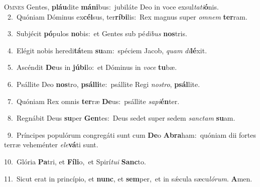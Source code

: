 \lettrine{\initial\textcolor{\initialcolor}{O}}{mnes} Gentes, \textbf{pláu}\-dite \textbf{má}\-\textbf{ni}bus:~\star jubiláte Deo in voce exsul\-\textit{ta}\-\textit{ti}\textbf{ó}nis.\\
{\numbfont\textcolor{\numbcolor}{~2.}}~Quóniam Dóminus ex\-\textbf{cél}\-sus, ter\-\textbf{rí}\-\textbf{bi}lis:~\star Rex magnus super \textit{om}\-\textit{nem} \textbf{ter}\-ram.\par
{\numbfont\textcolor{\numbcolor}{~3.}}~Subjécit \textbf{pó}\-pulos \textbf{no}\-bis:~\star et Gentes sub pé\-\textit{di}\-\textit{bus} \textbf{nos}\-tris.\par
{\numbfont\textcolor{\numbcolor}{~4.}}~Elégit nobis heredi\-\textbf{tá}\-tem \textbf{su}\-am:~\star spéciem Jacob, \textit{quam} \textit{di}\-\textbf{lé}xit.\par
{\numbfont\textcolor{\numbcolor}{~5.}}~Ascéndit \textbf{De}\-us in \textbf{jú}\-\textbf{bi}lo:~\star et Dóminus in \textit{vo}\-\textit{ce} \textbf{tu}\-bæ.\par
{\numbfont\textcolor{\numbcolor}{~6.}}~Psállite Deo \textbf{nos}\-tro, \textbf{psál}\-\textbf{li}te:~\star psállite Regi \textit{nos}\-\textit{tro}, \textbf{psál}\-lite.\par
{\numbfont\textcolor{\numbcolor}{~7.}}~Quóniam Rex omnis \textbf{ter}\-ræ \textbf{De}\-us:~\star psállite \textit{sa}\-\textit{pi}\textbf{én}ter.\par
{\numbfont\textcolor{\numbcolor}{~8.}}~Regnábit Deus \textbf{su}\-per \textbf{Gen}\-tes:~\star Deus sedet super sedem \textit{sanc}\-\textit{tam} \textbf{su}\-am.\par
{\numbfont\textcolor{\numbcolor}{~9.}}~Príncipes populórum congregáti sunt cum \textbf{De}\-o \textbf{A}\-\textbf{bra}ham:~\star quóniam dii fortes terræ veheménter \textit{e}\-\textit{le}\textbf{vá}ti sunt.\par
{\numbfont\textcolor{\numbcolor}{10.}}~Glória \textbf{Pa}\-tri, et \textbf{Fí}\-\textbf{li}o,~\star et Spirí\-\textit{tu}\-\textit{i} \textbf{Sanc}\-to.\par
{\numbfont\textcolor{\numbcolor}{11.}}~Sicut erat in princípio, et \textbf{nunc}\-, et \textbf{sem}\-per,~\star et in sǽcula sæcu\-\textit{ló}\-\textit{rum}. \textbf{A}\-men.\par

